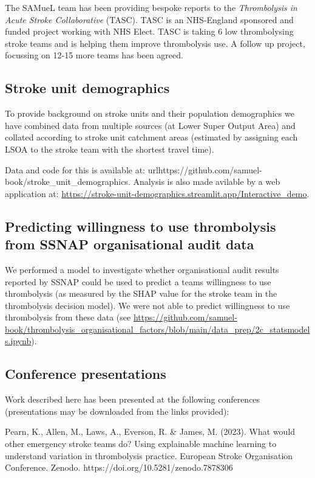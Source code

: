The SAMueL team has been providing bespoke reports to the \textit{Thrombolysis in Acute Stroke Collaborative} (TASC). TASC is an NHS-England sponsored and funded project working with NHS Elect. TASC is taking 6 low thrombolysing stroke teams and is helping them improve thrombolysis use. A follow up project, focussing on 12-15 more teams has been agreed.

\subsection{Stroke unit demographics}

To provide background on stroke units and their population demographics we have combined data from multiple sources (at Lower Super Output Area) and collated according to stroke unit catchment areas (estimated by assigning each LSOA to the stroke team with the shortest travel time).

Data and code for this is available at: url{https://github.com/samuel-book/stroke_unit_demographics}. Analysis is also made avilable by a web application at: \url{https://stroke-unit-demographics.streamlit.app/Interactive_demo}.

\subsection{Predicting willingness to use thrombolysis from SSNAP organisational audit data}

We performed a model to investigate whether organisational audit results reported by SSNAP could be used to predict a teams willingness to use thrombolysis (as measured by the SHAP value for the stroke team in the thrombolysis decision model). We were not able to predict willingness to use thrombolysis from these data (see \url{https://github.com/samuel-book/thrombolysis_organisational_factors/blob/main/data_prep/2c_statsmodels.ipynb}).

\subsection{Conference presentations}

Work described here has been presented at the following conferences (presentations may be downloaded from the links provided):

Pearn, K., Allen, M., Laws, A., Everson, R. & James, M. (2023). What would other emergency stroke teams do? Using explainable machine learning to understand variation in thrombolysis practice. European Stroke Organisation Conference. Zenodo. https://doi.org/10.5281/zenodo.7878306

